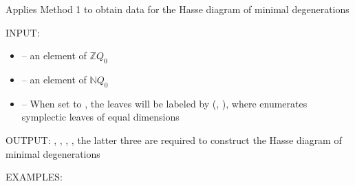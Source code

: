 \documentclass[letterpaper,10pt,english]{sphinxmanual}
\begin{document}
\begin{fulllineitems}
\label{\detokenize{index:quivercombinatorics.quivercombinatorics.Quiver.get_Hasse_diagram_method_1}}
\pysigstartsignatures
\pysiglinewithargsret
{}
{\sphinxparamcomma {}\sphinxparamcomma {}}
{}
\pysigstopsignatures
\sphinxAtStartPar
Applies Method 1 to obtain data for the Hasse diagram of minimal degenerations

\sphinxAtStartPar
INPUT:
\begin{itemize}
\item {} 
\sphinxAtStartPar
{} – an element of \(\mathbb{Z}Q_0\)

\item {} 
\sphinxAtStartPar
{} – an element of \(\mathbb{N}Q_0\)

\item {} 
\sphinxAtStartPar
{} – When set to , the leaves will be labeled by (, ), where  enumerates symplectic leaves of equal dimensions

\end{itemize}

\sphinxAtStartPar
OUTPUT: , , , , the latter three are required to construct the Hasse diagram of minimal degenerations

\sphinxAtStartPar
EXAMPLES:

\begin{sphinxVerbatim}[commandchars=\\\{\}]
  
   \PYG{p}{[}\PYG{p}{[}  \PYG{p}{]} \PYG{p}{[}  \PYG{p}{]} \PYG{p}{[}  \PYG{p}{]}\PYG{p}{]}
   
  


\end{sphinxVerbatim}
\end{fulllineitems}
\end{document}
